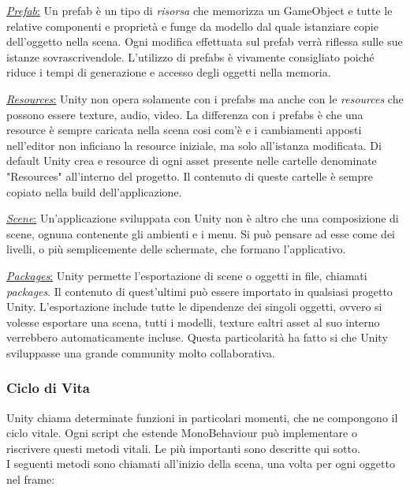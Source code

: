 \newpage

\begin{flushleft}
	\underline{\textit{Prefab}:}
	Un prefab è un tipo di \textit{risorsa} che memorizza un GameObject e tutte le relative componenti e proprietà e funge da modello dal quale istanziare copie dell'oggetto nella scena. Ogni modifica effettuata sul prefab verrà riflessa sulle sue istanze sovrascrivendole. L'utilizzo di prefabs è vivamente consigliato poiché riduce i tempi di generazione e accesso degli oggetti nella memoria.
\end{flushleft}

\begin{flushleft}
	\underline{\textit{Resources}:}
	Unity non opera solamente con i prefabs ma anche con le \textit{resources} che possono essere texture, audio, video. La differenza con i prefabs è che una resource è sempre caricata nella scena cosi com'è e i cambiamenti apposti nell'editor non inficiano la resource iniziale, ma solo all'istanza modificata.
	Di default Unity crea e resource di ogni asset presente nelle cartelle denominate "Resources" all'interno del progetto. Il contenuto di queste cartelle è sempre copiato nella build dell'applicazione.
\end{flushleft}

\begin{flushleft}
	\underline{\textit{Scene}:}
	Un'applicazione sviluppata con Unity non è altro che una composizione di scene, ognuna contenente gli ambienti e i menu. Si può pensare ad esse come dei livelli, o più semplicemente delle schermate, che formano l'applicativo.
\end{flushleft}
 
 \begin{flushleft}
 	\underline{\textit{Packages}:}
 Unity permette l'esportazione di scene o oggetti in file, chiamati \textit{packages}. Il contenuto di quest'ultimi può essere importato in qualsiasi progetto Unity. L'esportazione include tutte le dipendenze dei singoli oggetti, ovvero si volesse esportare una scena, tutti i modelli, texture ealtri asset al suo interno verrebbero automaticamente incluse. Questa particolarità ha fatto si che Unity sviluppasse una grande community molto collaborativa.
 \end{flushleft}
 
 \newpage
\subsubsection{Ciclo di Vita}
Unity chiama determinate funzioni in particolari momenti, che ne compongono il ciclo vitale. Ogni script che estende MonoBehaviour può implementare o riscrivere questi metodi vitali. Le più importanti sono descritte qui sotto.\\
\newline
I seguenti metodi sono chiamati all'inizio della scena, una volta per ogni oggetto nel frame:

